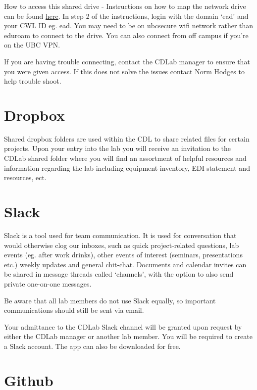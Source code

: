 \documentclass[
]{book}
\begin{document}
How to access this shared drive - Instructions on how to map the network drive can be found \href{https://it.ubc.ca/services/web-servers-storage/teamshare-storage-service/mapping-or-mounting-teamshare-macos}{here}. In step 2 of the instructions, login with the domain `ead' and your CWL ID eg. ead\finnr. You may need to be on ubcsecure wifi network rather than eduroam to connect to the drive. You can also connect from off campus if you're on the UBC VPN.

If you are having trouble connecting, contact the CDLab manager to ensure that you were given access. If this does not solve the issues contact Norm Hodges to help trouble shoot.

\hypertarget{dropbox}{%
\section*{Dropbox}\label{dropbox}}

Shared dropbox folders are used within the CDL to share related files for certain projects. Upon your entry into the lab you will receive an invitation to the CDLab shared folder where you will find an assortment of helpful resources and information regarding the lab including equipment inventory, EDI statement and resources, ect.

\hypertarget{slack}{%
\section*{Slack}\label{slack}}

Slack is a tool used for team communication. It is used for conversation that would otherwise clog our inboxes, such as quick project-related questions, lab events (eg. after work drinks), other events of interest (seminars, presentations etc.) weekly updates and general chit-chat. Documents and calendar invites can be shared in message threads called `channels', with the option to also send private one-on-one messages.

Be aware that all lab members do not use Slack equally, so important communications should still be sent via email.

Your admittance to the CDLab Slack channel will be granted upon request by either the CDLab manager or another lab member. You will be required to create a Slack account. The app can also be downloaded for free.

\hypertarget{github}{%
\section*{Github}\label{github}}
\end{document}
